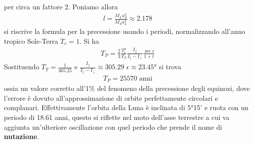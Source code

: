 \documentclass[a4paper, oneside]{book}
\begin{document}
per circa un fattore 2. Poniamo allora 
\begin{gather*}
    l = \frac{M_La_S^{3}}{M_Sa_L^{3}} \approx 2.178
\end{gather*}
si riscrive la formula per la precessione usando i periodi, 
normalizzando all'anno tropico Sole-Terra $T_r = 1$. Si ha 
\begin{gather*}
    T_P = \frac{2}{3}\frac{T_r^{2}}{T_T} \frac{I_\parallel}{I_\parallel - I_\perp} \frac{\sec\epsilon}{1 + l}
\end{gather*}
Sostituendo  $T_T = \frac{1}{365.25}$ e $\frac{I_\parallel}{I_\parallel - I_\perp} \approx 305.29$ $\epsilon \approx 23.45$° si trova 
\begin{align}
    \boxed{T_P = 25570 \text{ anni}}
\end{align}
ossia un valore corretto all'1\% del fenomeno della precessione degli equinozi, 
dove l'errore è dovuto all'approssimazione di orbite perfettamente circolari e complanari. 
Effettivamente l'orbita della Luna è inclinata di $5$°15' e ruota con un periodo di 18.61 anni, 
questo si riflette nel moto dell'asse terrestre a cui va aggiunta un'ulteriore oscillazione 
con quel periodo che prende il nome di \textbf{nutazione}.
\end{document}
